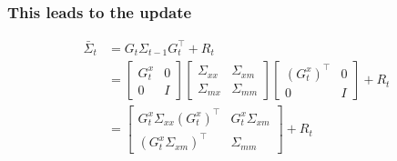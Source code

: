 \begin{frame}
    \frametitle{This leads to the update}

    \begin{align*}
        \bar{\Sigma}_t &= G_t \Sigma_{t-1} G_t^{\top} + R_t \\
        &= 
        \begin{bmatrix}
        G_t^x & 0 \\
        0 & I
        \end{bmatrix}
        \begin{bmatrix}
        \Sigma_{xx} & \Sigma_{xm} \\
        \Sigma_{mx} & \Sigma_{mm}
        \end{bmatrix}
        \begin{bmatrix}
        (G_t^x)^{\top} & 0 \\
        0 & I
        \end{bmatrix}
        + R_t \\
        &=
        \begin{bmatrix}
        G_t^x \Sigma_{xx} (G_t^x)^{\top} & G_t^x \Sigma_{xm} \\
        (G_t^x \Sigma_{xm})^{\top} & \Sigma_{mm}
        \end{bmatrix}
        + R_t
    \end{align*}

\end{frame}

